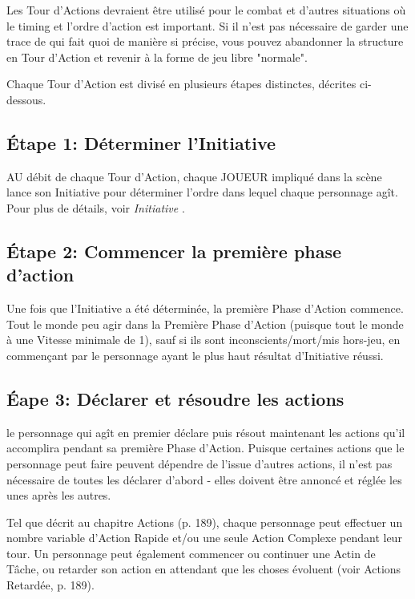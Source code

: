 Les Tour d'Actions devraient être utilisé pour le combat et d'autres situations où le timing et l'ordre d'action est important. Si il n'est pas nécessaire de garder une trace de qui fait quoi de manière si précise, vous pouvez abandonner la structure en Tour d'Action et revenir à la forme de jeu libre "normale". 

Chaque Tour d'Action est divisé en plusieurs étapes distinctes, décrites ci-dessous. 

\subsection{Étape 1: Déterminer l'Initiative} \label{sec:roll-initiative} 

AU débit de chaque Tour d'Action, chaque JOUEUR impliqué dans la scène lance son Initiative pour déterminer l'ordre dans lequel chaque personnage agît. Pour plus de détails, voir \emph{ Initiative }. 

\subsection{Étape 2: Commencer la première phase d'action} \label{sec:begin-first-phase} 

Une fois que l'Initiative a été déterminée, la première Phase d'Action commence. Tout le monde peu agir dans la Première Phase d'Action (puisque tout le monde à une Vitesse minimale de 1), sauf si ils sont inconscients/mort/mis hors-jeu, en commençant par le personnage ayant le plus haut résultat d'Initiative réussi. 

\subsection{Éape 3: Déclarer et résoudre les actions} \label{sec:declare-resolve} 

le personnage qui agît en premier déclare puis résout maintenant les actions qu'il accomplira pendant sa première Phase d'Action. Puisque certaines actions que le personnage peut faire peuvent dépendre de l'issue d'autres actions, il n'est pas nécessaire de toutes les déclarer d'abord - elles doivent être annoncé et réglée les unes après les autres. 

Tel que décrit au chapitre Actions (p. 189), chaque personnage peut effectuer un nombre variable d'Action Rapide et/ou une seule Action Complexe pendant leur tour. Un personnage peut également commencer ou continuer une Actin de Tâche, ou retarder son action en attendant que les choses évoluent (voir Actions Retardée, p. 189). 

